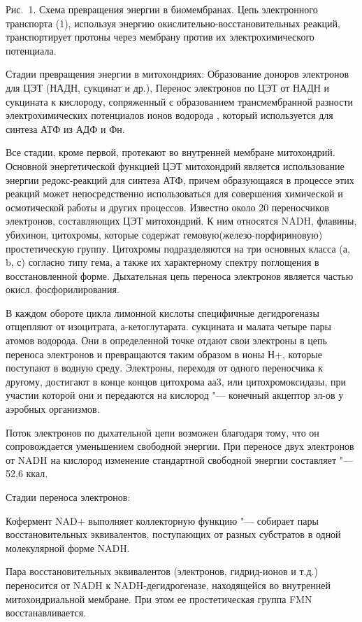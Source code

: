 \documentclass[12pt,a4paper,oneside]{book}
\begin{document}
Рис.~1. Схема превращения энергии в биомембранах. Цепь электронного транспорта (1), используя энергию окислительно-восстановительных реакций, транспортирует протоны через мембрану против их электрохимического потенциала. 

Стадии превращения энергии в митохондриях:
Образование доноров электронов для ЦЭТ (НАДН, сукцинат и др.),
Перенос электронов по ЦЭТ от НАДН и сукцината к кислороду, сопряженный с образованием трансмембранной разности электрохимических потенциалов ионов водорода , который используется для синтеза АТФ из АДФ и Фн.

Все стадии, кроме первой, протекают во внутренней мембране митохондрий. Основной энергетической функцией ЦЭТ митохондрий является использование энергии редокс-реакций для синтеза АТФ, причем образующаяся в процессе этих реакций может непосредственно использоваться для совершения химической и осмотической работы и других процессов.
Известно около 20 переносчиков электронов, составляющих ЦЭТ митохондрий. К ним относятся NADH, флавины, убихинон, цитохромы, которые содержат гемовую(железо-порфириновую) простетическую группу. Цитохромы подразделяются на три основных класса (а, b, с) согласно типу гема, а также их характерному спектру поглощения в восстановленной форме.
Дыхательная цепь переноса электронов является частью окисл. фосфорилирования.

В каждом обороте цикла лимонной кислоты специфичные дегидрогеназы отщепляют от изоцитрата, а-кетоглутарата. сукцината и малата четыре пары атомов водорода. Они в определенной точке отдают свои электроны в цепь переноса электронов и превращаются таким образом в ионы Н+, которые поступают в водную среду. Электроны, переходя от одного переносчика к другому, достигают в конце концов цитохрома аа3, или цитохромоксидазы, при участии которой они и передаются на кислород "--- конечный акцептор эл-ов у аэробных организмов.

Поток электронов по дыхательной цепи возможен благодаря тому, что он сопровождается уменьшением свободной энергии. При переносе двух электронов от NADH на кислород изменение стандартной свободной энергии составляет "--- 52,6 ккал.

Стадии переноса электронов:

Кофермент NAD+ выполняет коллекторную функцию "--- собирает пары восстановительных эквивалентов, поступающих от разных субстратов в одной молекулярной форме NADH.

Пара восстановительных эквивалентов (электронов, гидрид-ионов и т.д.) переносится от NADH к NADH-дегидрогеназе, находящейся во внутренней митохондриальной мембране. При этом ее простетическая группа FMN восстанавливается.
\end{document}
